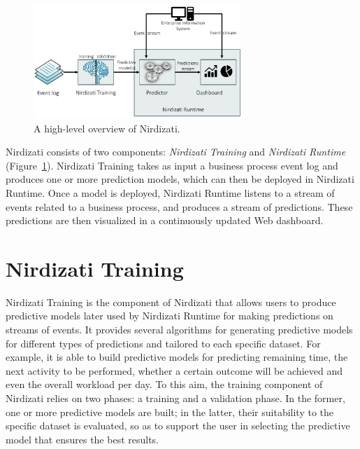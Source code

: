 \documentclass[runningheads,a4paper]{llncs}
\begin{document}
\begin{figure}[t]%
	\centering
	\includegraphics[width=0.7\textwidth]{img/nirdizati-overall}
	\caption{A high-level overview of Nirdizati.}
	\label{fig:nirdizati-overall}
\end{figure}


Nirdizati consists of two components: \textit{Nirdizati Training} and \textit{Nirdizati Runtime} (Figure~\ref{fig:nirdizati-overall}). Nirdizati Training takes as input a business process event log and produces one or more prediction models, which can then be deployed in Nirdizati Runtime. Once a model is deployed, Nirdizati Runtime listens to a stream of events related to a business process, and produces a stream of predictions. These predictions are then visualized in a continuously updated Web dashboard.

\section{Nirdizati Training} \label{sec:training}
Nirdizati Training is the component of Nirdizati that allows users to produce predictive models later used by
Nirdizati Runtime for making predictions on streams of events. It provides several algorithms for generating
predictive models for different types of predictions and tailored to each specific dataset.
For example, it is able to build predictive models for predicting remaining time, the next activity to be
performed, whether a certain outcome will be achieved and even the overall workload per day.
%
To this aim, the training component of Nirdizati relies on two phases: a training and a validation phase.
In the former, one or more predictive models are built; in the latter, their suitability to the specific
dataset is evaluated, so as to support the user in selecting the predictive model that ensures the best results.
\end{document}
